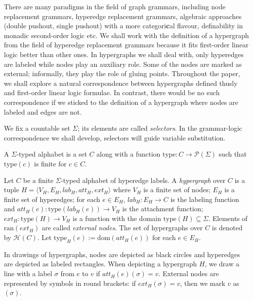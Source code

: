 \documentclass[a4paper,UKenglish,cleveref, autoref, thm-restate,pdfa]{lipics-v2021}
\newcommand{\eqdef}{:=}
\newcommand{\dom}{\mathrm{dom}}
\newcommand{\ran}{\mathrm{ran}}
\newcommand{\lab}{\mathit{lab}}
\newcommand{\att}{\mathit{att}}
\newcommand{\ext}{\mathit{ext}}
\newcommand{\type}{\mathrm{type}}
\newcommand{\HG}{\mathcal{H}}
\begin{document}
There are many paradigms in the field of graph grammars, including node replacement grammars, hyperedge replacement grammars, algebraic approaches (double pushout, single pushout) with a more categori\textbf{c}al flavour, definability in monadic second-order logic etc. We shall work with the definition of a hypergraph from the field of hyperedge replacement grammars \cite{DrewesKH97,Engelfriet97,Habel92} because it fits first-order linear logic better than other ones. In hypergraphs we shall deal with, only hyperedges are labeled while nodes play an auxiliary role. Some of the nodes are marked as external; informally, they play the role of gluing points. Throughout the paper, we shall explore a natural correspondence between hypergraphs defined thusly and first-order linear logic formulae. In contrast, there would be no such correspondence if we sticked to the definition of a hypergraph where nodes are labeled and edges are not.

We fix a countable set $\Sigma$; its elements are called \emph{selectors}. In the grammar-logic correspondence we shall develop, selectors will guide variable substitution.
\begin{definition}
	A $\Sigma$-typed alphabet is a set $C$ along with a function $\type:C \to \mathcal{P}(\Sigma)$ such that $\type(c)$ is finite for $c \in C$.
\end{definition}

\begin{definition}
	Let $C$ be a finite $\Sigma$-typed alphabet of hyperedge labels. A \emph{hypergraph} over $C$ is a tuple $H = \langle V_H,E_H, \lab_H, \att_H, \ext_H\rangle$ where  $V_H$ is a finite set of nodes; $E_H$ is a finite set of hyperedges; for each $e \in E_H$, $\lab_H:E_H \to C$ is the labeling function and $\att_H(e):\type(\lab_H(e)) \to V_H$ is the attachment function; $\ext_H: \type(H) \to V_H$ is a function with the domain $\type(H) \subseteq \Sigma$. Elements of $\ran(\ext_H)$ are called \emph{external nodes}. The set of hypergraphs over $C$ is denoted by $\HG(C)$. 
	Let $\type_H(e) \eqdef \dom(\att_H(e))$ for each $e \in E_H$.
\end{definition}

In drawings of hypergraphs, nodes are depicted as black circles and hyperedges are depicted as labeled rectangles. When depicting a hypergraph $H$, we draw a line with a label $\sigma$ from $e$ to $v$ if $\att_H(e)(\sigma)=v$. External nodes are represented by symbols in round brackets: if $ext_H(\sigma)=v$, then we mark $v$ as $(\sigma)$. 
\end{document}
